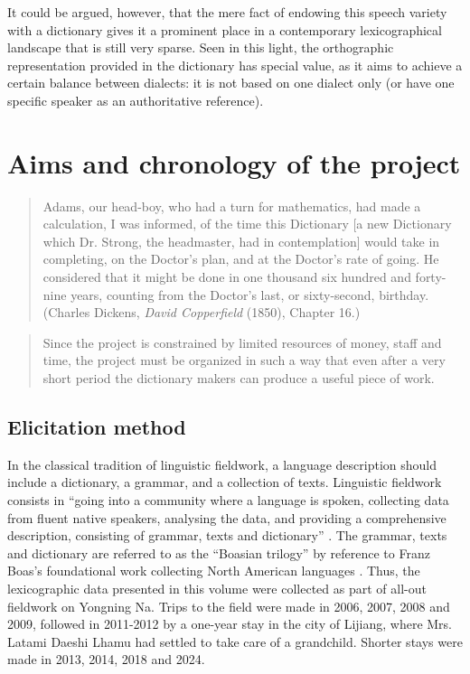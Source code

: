 It could be argued, however, that the mere fact of endowing this speech variety with a dictionary gives it a prominent place in a contemporary lexicographical landscape that is still very sparse. Seen in this light, the orthographic representation provided in the dictionary has special value, as it aims to achieve a certain balance between dialects: it is not based on one dialect only (or have one specific speaker as an authoritative reference).

\section{Aims and chronology of the project}
\label{sec:chronologie}

\begin{quotation}
    Adams, our head-boy, who had a turn for mathematics, had made a calculation, I was informed, of the time this Dictionary [a new Dictionary which Dr. Strong, the headmaster, had in contemplation] would take in completing, on the Doctor’s plan, and at the Doctor’s rate of going. He considered that it might be done in one thousand six hundred and forty-nine years, counting from the Doctor’s last, or sixty-second, birthday. (Charles Dickens, \emph{David Copperfield} (1850), Chapter 16.)
\end{quotation}

\begin{quotation}
    Since the project is constrained by limited resources of money, staff and time, the project must be organized in such a way that even after a very short period the dictionary makers can produce a useful piece of work. \parencite[``Dictionary making in endangered speech communities'':][42]{mosel_dictionary_2004}
\end{quotation}

\subsection{Elicitation method}

In the classical tradition of linguistic fieldwork, a language description should include a dictionary, a grammar, and a collection of texts. Linguistic fieldwork consists in “going into a community where a language is spoken, collecting data from fluent native speakers, analysing the data, and providing a comprehensive description, consisting of grammar, texts and dictionary” \parencite[12]{dixon2007}. The grammar, texts and dictionary are referred to as the “Boasian trilogy” \parencite{foley1999} by reference to Franz Boas’s foundational work collecting North American languages \parencite{boas1902,boasetal1911}. Thus, the lexicographic data presented in this volume were collected as part of all-out fieldwork on Yongning Na. Trips to the field were made in 2006, 2007, 2008 and 2009, followed in 2011-2012 by a one-year stay in the city of Lijiang, where Mrs. Latami Daeshi Lhamu had settled to take care of a grandchild. Shorter stays were made in 2013, 2014, 2018 and 2024.

